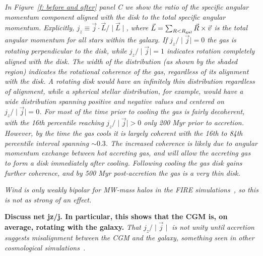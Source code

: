 \documentclass[fleqn,usenatbib]{mnras}
\begin{document}
\textit{
In Figure~\ref{f: before and after} panel C we show the ratio of the specific angular momentum component aligned with the disk to the total specific angular momentum.
Explicitly, $j_z \equiv \vec j \cdot \vec L / \mid \vec L \mid $, where $\vec L = \sum_{R < R_{\rm gal}} \vec R \times \vec v$ is the total angular momentum for all stars within the galaxy.
If $j_z/\mid \vec j \mid=0$ the gas is rotating perpendicular to the disk, while $j_z/\mid \vec j \mid=1$  indicates rotation completely aligned with the disk.
The width of the distribution (as shown by the shaded region) indicates the rotational coherence of the gas, regardless of its alignment with the disk.
A rotating disk would have an infinitely thin distribution regardless of alignment, while a spherical stellar distribution, for example, would have a wide distribution spanning positive and negative values and centered on  $j_z/\mid \vec j \mid=0$.
For most of the time prior to cooling the gas is fairly decoherent, with the 16th percentile reaching  $j_z/\mid \vec j \mid > 0$  only 200 Myr prior to accretion.
However, by the time the gas cools it is largely coherent with the 16th to 84th percentile interval spanning $\sim 0.3$.
The increased coherence is likely due to angular momentum exchange between hot accreting gas, and will allow the accreting gas to form a disk immediately after cooling.
Following cooling the gas disk gains further coherence, and by 500 Myr post-accretion the gas is a very thin disk.
}


\textit{
Wind is only weakly bipolar for MW-mass halos in the FIRE simulations~\citep{Hafen2019}, so this is not as strong of an effect.
}

\textbf{
Discuss net jz/j.
In particular, this shows that the CGM is, on average, rotating with the galaxy.
}
\textit{
That $j_z/\mid \vec j \mid$ is not unity until accretion suggests misalignment between the CGM and the galaxy, something seen in other cosmological simulations~\citep[e.g.][]{Defelippis2021}.
}
\end{document}
